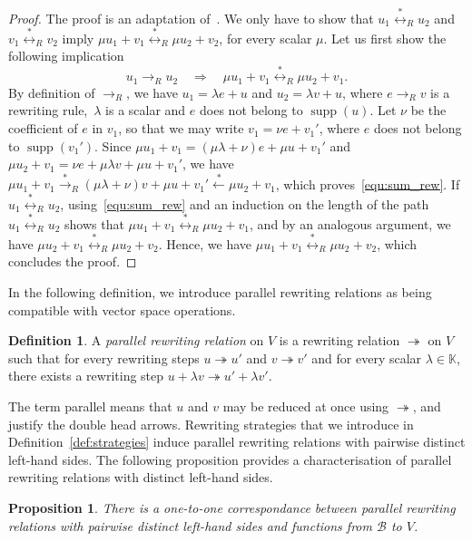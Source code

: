 \documentclass[11pt]{article}
\newtheorem{proposition}[theorem]{Proposition}
\theoremstyle{definition}
\newtheorem{definition}[theorem]{Definition}
\newcommand\basis{\mathscr{B}}
\DeclareMathOperator{\supp}{supp}
\newcommand\K{\mathbb{K}}
\newcommand\rewR{\to_R}
\newcommand\parRew{\twoheadrightarrow}
\newcommand\transR{\overset{*}{\to}_R}
\newcommand\equivR{\overset{*}{\leftrightarrow}_R}
\begin{document}
\begin{proof}
  The proof is an adaptation
  of~\cite[Lemma 3.1.3]{GuiraudHoffbeckMalbos19}. We only have to show
  that $u_1\equivR u_2$ and $v_1\equivR v_2$ imply
  $\mu u_1+ v_1\equivR\mu u_2+v_2$, for every scalar $\mu$. Let us first
  show the following implication
  \begin{equation}\label{equ:sum_rew}
    u_1\rewR u_2\quad\Rightarrow\quad\mu u_1+v_1\equivR\mu u_2+v_1.
  \end{equation}
  By
  definition of $\rewR$, we have $u_1=\lambda e+u$ and $u_2=\lambda v+u$,
  where $e\rewR v$ is a rewriting rule,~$\lambda$ is a scalar and $e$
  does not belong to $\supp(u)$. Let $\nu$ be the coefficient of $e$ in
  $v_1$, so that we may write $v_1=\nu e+v_1'$, where $e$ does not belong
  to $\supp(v_1')$. Since $\mu u_1+v_1=(\mu\lambda+\nu)e+\mu u+v_1'$ and
  $\mu u_2+v_1=\nu e+\mu\lambda v +\mu u+v_1'$, we have $\mu u_1+v_1
  \transR(\mu\lambda+\nu)v+\mu u+v_1'\overset{*}{\leftarrow}\mu u_2+v_1$,
  which proves~\eqref{equ:sum_rew}. If $u_1\equivR u_2$,
  using~\eqref{equ:sum_rew} and an induction on the length of the path
  $u_1\equivR u_2$ shows that $\mu u_1+v_1\equivR\mu u_2+v_1$, and by an
  analogous argument, we have $\mu u_2+v_1\equivR\mu u_2+v_2$. Hence, we
  have $\mu u_1+v_1\equivR\mu u_2+v_2$, which concludes the proof.
\end{proof}
\smallskip

In the following definition, we introduce parallel rewriting relations as
being compatible with vector space operations.
\smallskip

\begin{definition}
  A {\em parallel rewriting relation} on $V$ is a rewriting relation
  $\parRew$ on $V$ such that for every rewriting steps $u\parRew u'$ and
  $v\parRew v'$ and for every scalar $\lambda\in\K$, there exists a 
  rewriting step $u+\lambda v\parRew u'+\lambda v'$.
\end{definition}

The term parallel means that $u$ and $v$ may be reduced at once using
$\parRew$, and justify the double head arrows. Rewriting strategies that
we introduce in Definition~\ref{def:strategies} induce parallel rewriting
relations with pairwise distinct left-hand sides. The following
proposition provides a characterisation of parallel rewriting relations
with distinct left-hand sides. 
\smallskip

\begin{proposition}\label{prop:parRew_function}
  There is a one-to-one correspondance between parallel rewriting
  relations with pairwise distinct left-hand sides and functions from
  $\basis$ to $V$.
\end{proposition}
\end{document}
